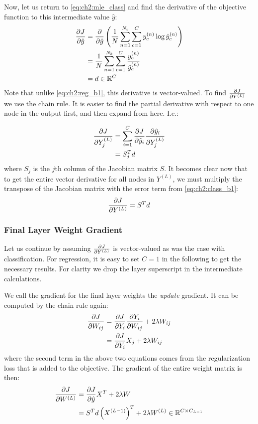 Now, let us return to \eqref{eq:ch2:mle_class} and find the derivative of the
objective function to this intermediate value $\hat{y}$:
\begin{align}
  \dydx{J}{\hat{y}} &=  \dydx{}{\hat{y}} \left( \frac{1}{N}\sum_{n=1}^{N_b} \sum_{c=1}^C 
  y^{(n)}_c \log \hat{y}^{(n)}_c \right) \\
  &= \frac{1}{N}\sum_{n=1}^{N_b} \sum_{c=1}^C \frac{y^{(n)}_c}{\hat{y}^{(n)}_c} \\
  &= d \in \reals[C] \label{eq:ch2:class_b1}
\end{align}
Note that unlike \eqref{eq:ch2:reg_b1}, this derivative is vector-valued. To
find $\dydx{J}{Y^{(L)}}$ we use the chain rule. It is easier to find the
partial derivative with respect to one node in the output first, and then expand
from here. I.e.:

\begin{align}
  \dydx{J}{Y^{(L)}_j} &= \sum_{i=1}^C \dydx{J}{\hat{y}_i}\dydx{\hat{y}_i}{Y^{(L)}_j} \\
                      &= S_j^T d
\end{align}
where $S_j$ is the $j$th column of the Jacobian matrix $S$. It becomes clear now
that to get the entire vector derivative for all nodes in $Y^{(L)}$, we must
multiply the transpose of the Jacobian matrix with the error term from
\eqref{eq:ch2:class_b1}:
\begin{equation}
  \dydx{J}{Y^{(L)}} = S^T d
\end{equation}

\subsubsection{Final Layer Weight Gradient} \label{sec:ch2:weight}
Let us continue by assuming $\dydx{J}{Y^{(L)}}$ is vector-valued as was the case
with classification. For regression, it is easy to set $C=1$ in the following to
get the necessary results. For clarity we drop the layer
superscript in the intermediate calculations.

We call the gradient for the final layer weights the \emph{update} gradient. 
It can be computed by the chain rule again:
\begin{align}
  \dydx{J}{W_{ij}} &= \dydx{J}{Y_i} \dydx{Y_i}{W_{ij}} + 2\lambda W_{ij} \\
                   &= \dydx{J}{Y_i} X_j + 2\lambda W_{ij}
\end{align}
where the second term in the above two equations comes from the regularization
loss that is added to the objective. The gradient of the entire weight matrix is 
then:
\begin{align}
  \dydx{J}{W^{(L)}} &= \dydx{J}{\hat{y}} X^T +2\lambda W \\
                    &= S^T d \left(X^{(L-1)}\right)^T + 2\lambda W^{(L)} \in \reals[C \x C_{L-1}]
\end{align}

